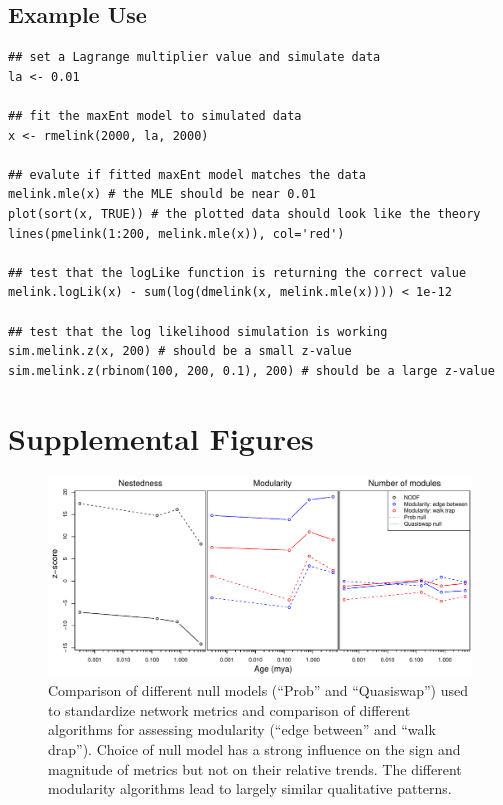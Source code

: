 \subsection{Example Use}

\begin{verbatim}
## set a Lagrange multiplier value and simulate data
la <- 0.01

## fit the maxEnt model to simulated data
x <- rmelink(2000, la, 2000)

## evalute if fitted maxEnt model matches the data
melink.mle(x) # the MLE should be near 0.01
plot(sort(x, TRUE)) # the plotted data should look like the theory
lines(pmelink(1:200, melink.mle(x)), col='red')

## test that the logLike function is returning the correct value
melink.logLik(x) - sum(log(dmelink(x, melink.mle(x)))) < 1e-12

## test that the log likelihood simulation is working
sim.melink.z(x, 200) # should be a small z-value
sim.melink.z(rbinom(100, 200, 0.1), 200) # should be a large z-value
\end{verbatim}

\printbibliography

\clearpage

\section*{Supplemental Figures}

\begin{figure}[!hp]
  \centering
  \includegraphics[scale=0.6]{figs/figSupp_netMetComp.pdf}
  \caption[Comparison of different null models]{Comparison of
    different null models (``Prob'' and ``Quasiswap'') used to
    standardize network metrics and comparison of different algorithms
    for assessing modularity (``edge between'' and ``walk
    drap''). Choice of null model has a strong influence on the sign
    and magnitude of metrics but not on their relative trends. The
    different modularity algorithms lead to largely similar
    qualitative patterns.}
  \label{figSupp:netMetComp}
\end{figure}

